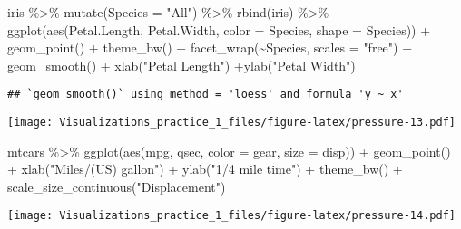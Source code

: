 \documentclass[
]{article}
\newenvironment{Shaded}{\begin{snugshade}}{\end{snugshade}}
\newcommand{\AttributeTok}[1]{\textcolor[rgb]{0.77,0.63,0.00}{#1}}
\newcommand{\FunctionTok}[1]{\textcolor[rgb]{0.00,0.00,0.00}{#1}}
\newcommand{\NormalTok}[1]{#1}
\newcommand{\SpecialCharTok}[1]{\textcolor[rgb]{0.00,0.00,0.00}{#1}}
\newcommand{\StringTok}[1]{\textcolor[rgb]{0.31,0.60,0.02}{#1}}
\begin{document}
\begin{Shaded}
\begin{Highlighting}[]
\NormalTok{iris }\SpecialCharTok{\%\textgreater{}\%} 
  \FunctionTok{mutate}\NormalTok{(}\AttributeTok{Species =} \StringTok{"All"}\NormalTok{) }\SpecialCharTok{\%\textgreater{}\%} \FunctionTok{rbind}\NormalTok{(iris) }\SpecialCharTok{\%\textgreater{}\%} 
  \FunctionTok{ggplot}\NormalTok{(}\FunctionTok{aes}\NormalTok{(Petal.Length, Petal.Width, }\AttributeTok{color =}\NormalTok{ Species, }\AttributeTok{shape =} 
\NormalTok{  Species)) }\SpecialCharTok{+} \FunctionTok{geom\_point}\NormalTok{() }\SpecialCharTok{+} \FunctionTok{theme\_bw}\NormalTok{() }\SpecialCharTok{+} \FunctionTok{facet\_wrap}\NormalTok{(}\SpecialCharTok{\textasciitilde{}}\NormalTok{Species, }\AttributeTok{scales =} 
  \StringTok{"free"}\NormalTok{) }\SpecialCharTok{+} \FunctionTok{geom\_smooth}\NormalTok{() }\SpecialCharTok{+} \FunctionTok{xlab}\NormalTok{(}\StringTok{"Petal Length"}\NormalTok{) }\SpecialCharTok{+}\FunctionTok{ylab}\NormalTok{(}\StringTok{"Petal Width"}\NormalTok{)}
\end{Highlighting}
\end{Shaded}

\begin{verbatim}
## `geom_smooth()` using method = 'loess' and formula 'y ~ x'
\end{verbatim}

\texttt{[image: Visualizations\_practice\_1\_files/figure-latex/pressure-13.pdf]}

\begin{Shaded}
\begin{Highlighting}[]
\NormalTok{mtcars }\SpecialCharTok{\%\textgreater{}\%} \FunctionTok{ggplot}\NormalTok{(}\FunctionTok{aes}\NormalTok{(mpg, qsec, }\AttributeTok{color =}\NormalTok{ gear, }\AttributeTok{size =}\NormalTok{ disp)) }\SpecialCharTok{+} 
  \FunctionTok{geom\_point}\NormalTok{() }\SpecialCharTok{+} \FunctionTok{xlab}\NormalTok{(}\StringTok{"Miles/(US) gallon"}\NormalTok{) }\SpecialCharTok{+} \FunctionTok{ylab}\NormalTok{(}\StringTok{"1/4 mile time"}\NormalTok{) }\SpecialCharTok{+} 
  \FunctionTok{theme\_bw}\NormalTok{() }\SpecialCharTok{+} \FunctionTok{scale\_size\_continuous}\NormalTok{(}\StringTok{"Displacement"}\NormalTok{)}
\end{Highlighting}
\end{Shaded}

\texttt{[image: Visualizations\_practice\_1\_files/figure-latex/pressure-14.pdf]}
\end{document}
